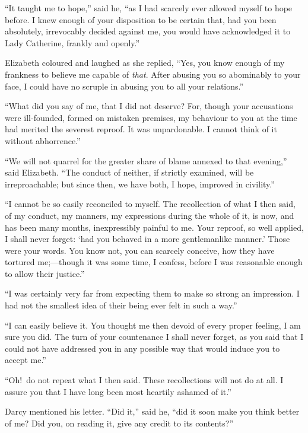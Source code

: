 \documentclass[12pt,english,oneside]{book}
\begin{document}
{}``It taught me to hope,'' said he, {}``as I had scarcely ever
allowed myself to hope before. I knew enough of your disposition to
be certain that, had you been absolutely, irrevocably decided against
me, you would have acknowledged it to Lady Catherine, frankly and
openly.''

Elizabeth coloured and laughed as she replied, {}``Yes, you know
enough of my frankness to believe me capable of \textit{that}. After
abusing you so abominably to your face, I could have no scruple in
abusing you to all your relations.''

{}``What did you say of me, that I did not deserve? For, though your
accusations were ill-founded, formed on mistaken premises, my behaviour
to you at the time had merited the severest reproof. It was unpardonable.
I cannot think of it without abhorrence.''

{}``We will not quarrel for the greater share of blame annexed to
that evening,'' said Elizabeth. {}``The conduct of neither, if strictly
examined, will be irreproachable; but since then, we have both, I
hope, improved in civility.''

{}``I cannot be so easily reconciled to myself. The recollection
of what I then said, of my conduct, my manners, my expressions during
the whole of it, is now, and has been many months, inexpressibly painful
to me. Your reproof, so well applied, I shall never forget: `had you
behaved in a more gentlemanlike manner.' Those were your words. You
know not, you can scarcely conceive, how they have tortured me;\mbox{---}though
it was some time, I confess, before I was reasonable enough to allow
their justice.''

{}``I was certainly very far from expecting them to make so strong
an impression. I had not the smallest idea of their being ever felt
in such a way.''

{}``I can easily believe it. You thought me then devoid of every
proper feeling, I am sure you did. The turn of your countenance I
shall never forget, as you said that I could not have addressed you
in any possible way that would induce you to accept me.''

{}``Oh!\ do not repeat what I then said. These recollections will
not do at all. I assure you that I have long been most heartily ashamed
of it.''

Darcy mentioned his letter. {}``Did it,'' said he, {}``did it soon
make you think better of me? Did you, on reading it, give any credit
to its contents?''\ 
\end{document}

